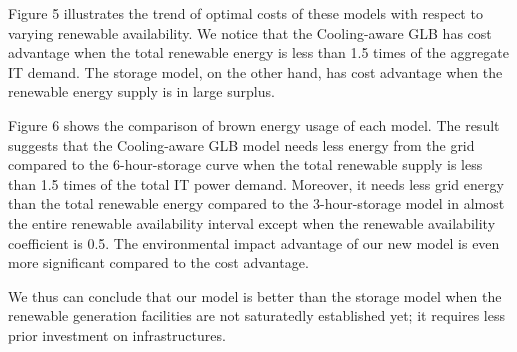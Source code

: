 \documentclass{acm_proc_article-sp}
\begin{document}
Figure 5 illustrates the trend of optimal costs of these models with respect to varying renewable availability. We notice that the Cooling-aware GLB has cost advantage when the total renewable energy is less than 1.5 times of the aggregate IT demand. The storage model, on the other hand, has cost advantage when the renewable energy supply is in large surplus. 

Figure 6 shows the comparison of brown energy usage of each model. The result suggests that the Cooling-aware GLB model needs less energy from the grid compared to the 6-hour-storage curve when the total renewable supply is less than 1.5 times of the total IT power demand. Moreover, it needs less grid energy than the total renewable energy compared to the 3-hour-storage model in almost the entire renewable availability interval except when the renewable availability coefficient is 0.5. The environmental impact advantage of our new model is even more significant compared to the cost advantage.  

We thus can conclude that our model is better than the storage model when the renewable generation facilities are not saturatedly established yet; it requires less prior investment on infrastructures.



\end{document}

